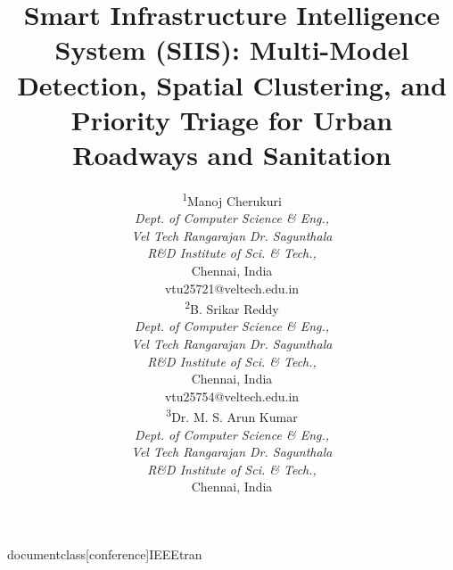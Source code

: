documentclass[conference]{IEEEtran}
\pagestyle{empty}

\usepackage{cite}
\usepackage{amsmath,amssymb,amsfonts}
\usepackage{algorithmic}
\usepackage{algorithm}
\usepackage{graphicx}
\graphicspath{{./}{./figures/}}
\usepackage{textcomp}
\usepackage{xcolor}
\usepackage{array}
\usepackage{booktabs}
\usepackage{url}

\newcommand{\screenshotbox}[2]{%
  \fbox{\parbox[c][#1][c]{0.95\columnwidth}{\centering
    \vspace{0.5em}
    \textbf{[ PASTE SCREENSHOT HERE ]}\\[0.4em]
    \small #2
    \vspace{0.5em}
  }}%
}



\title{Smart Infrastructure Intelligence System (SIIS): Multi-Model Detection, Spatial Clustering, and Priority Triage for Urban Roadways and Sanitation}

\author{
\begin{minipage}[t]{0.31\textwidth}
\centering
\textsuperscript{1}Manoj Cherukuri\\
\textit{\small Dept. of Computer Science \& Eng.,}\\
\textit{\small Vel Tech Rangarajan Dr. Sagunthala}\\
\textit{\small R\&D Institute of Sci. \& Tech.,}\\
{\small Chennai, India}\\
{\footnotesize vtu25721@veltech.edu.in}
\end{minipage}
\hfill
\begin{minipage}[t]{0.32\textwidth}
\centering
\textsuperscript{2}B. Srikar Reddy\\
\textit{\small Dept. of Computer Science \& Eng.,}\\
\textit{\small Vel Tech Rangarajan Dr. Sagunthala}\\
\textit{\small R\&D Institute of Sci. \& Tech.,}\\
{\small Chennai, India}\\
{\footnotesize vtu25754@veltech.edu.in}
\end{minipage}
\hfill
\begin{minipage}[t]{0.31\textwidth}
\centering
\textsuperscript{3}Dr. M. S. Arun Kumar\\
\textit{\small Dept. of Computer Science \& Eng.,}\\
\textit{\small Vel Tech Rangarajan Dr. Sagunthala}\\
\textit{\small R\&D Institute of Sci. \& Tech.,}\\
{\small Chennai, India}
\end{minipage}
}

